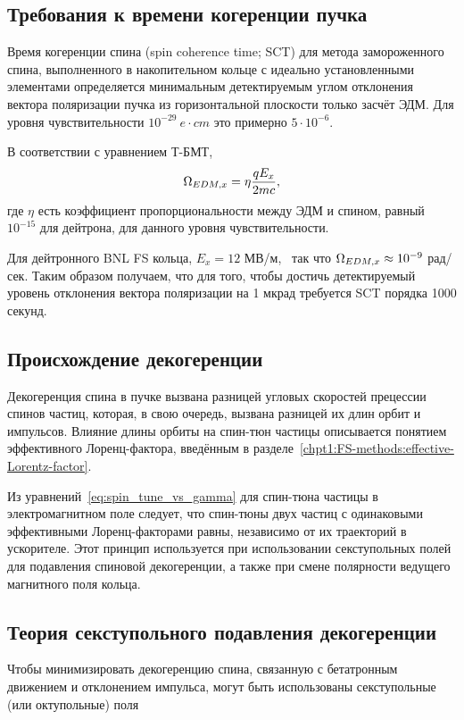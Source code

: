 

\subsection{Требования к времени когеренции пучка}
Время когеренции спина (spin coherence time; SCT) для метода
замороженного спина, выполненного в накопительном кольце с идеально
установленными элементами определяется минимальным детектируемым углом
отклонения вектора поляризации пучка из горизонтальной плоскости
только засчёт ЭДМ. Для уровня чувствительности $10^{-29}~e\cdot cm$
это примерно $5\cdot10^{-6}$.~\cite{BNL:Deuteron2008}

В соответствии с уравнением Т-БМТ,
\[
\Omega_{EDM,x} = \eta\frac{qE_x}{2mc},
\]
где $\eta$ есть коэффициент пропорциональности между ЭДМ и спином,
равный $10^{-15}$ для дейтрона, для данного уровня чувствительности.~\cite[стр.~206]{Eremey:Thesis}

Для дейтронного BNL FS кольца, $E_x = 12$
МВ/м,~\cite[стр.~19]{BNL:Deuteron2008} так что $\Omega_{EDM,x}\approx
10^{-9}$ рад/сек. Таким образом получаем, что для того, чтобы достичь
детектируемый уровень отклонения вектора поляризации на 1 мкрад требуется SCT порядка 1000 секунд.~\cite[стр.~207]{Eremey:Thesis}
\subsection{Происхождение декогеренции}\label{sec:decoh:origin}
Декогеренция спина в пучке вызвана разницей угловых скоростей
прецессии спинов частиц, которая, в свою очередь, вызвана разницей
их длин орбит и импульсов. Влияние длины орбиты на спин-тюн частицы описывается 
понятием эффективного Лоренц-фактора, введённым в разделе~\ref{chpt1:FS-methods:effective-Lorentz-factor}.

Из уравнений~\eqref{eq:spin_tune_vs_gamma} для спин-тюна частицы в электромагнитном поле следует, 
что спин-тюны двух частиц с одинаковыми эффективными Лоренц-факторами равны, независимо от их траекторий в ускорителе. Этот принцип используется при использовании секступольных полей для подавления спиновой декогеренции, а также при смене полярности ведущего магнитного поля кольца.

\subsection{Теория секступольного подавления декогеренции}\label{sec:sextupole_spin_dec_solution}
Чтобы минимизировать декогеренцию спина, связанную с бетатронным
движением и отклонением импульса, могут быть использованы
секступольные (или октупольные) поля~\cite[стр.~212]{Eremey:Thesis}

